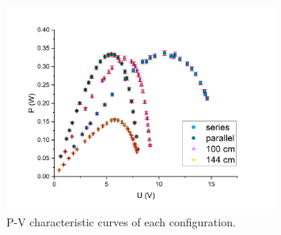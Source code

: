 \documentclass[a4paper]{article}
\begin{document}
\begin{figure}[H]
	\centering
	\includegraphics[width=0.8\textwidth]{P-U_characteristics.png}
	\caption{P-V characteristic curves of each configuration.}
	\label{fig::P-U}
\end{figure}
\end{document}
